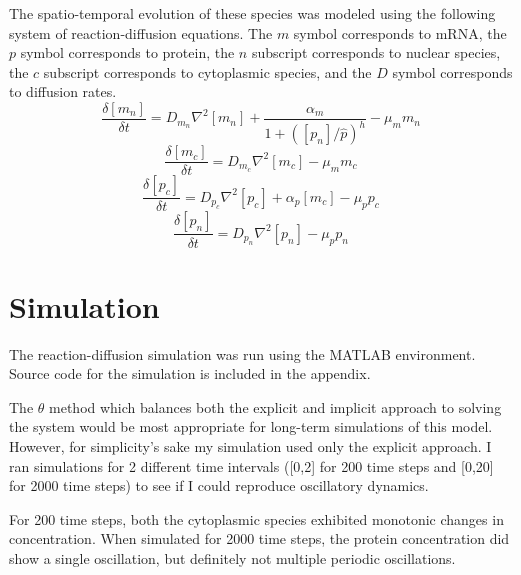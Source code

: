\documentclass{bioinfo}
\begin{document}
The spatio-temporal evolution of these species was modeled using the following system of reaction-diffusion equations.
The $m$ symbol corresponds to mRNA, the $p$ symbol corresponds to protein, the $n$ subscript corresponds to nuclear species, the $c$ subscript corresponds to cytoplasmic species, and the $D$ symbol corresponds to diffusion rates.
\[ \frac{\delta[m_n]}{\delta t} = D_{m_n} \nabla^2[m_n] + \frac{\alpha_m}{1+([p_n]/\hat{p})^h} - \mu_m{m_n} \]
\[ \frac{\delta[m_c]}{\delta t} = D_{m_c} \nabla^2[m_c] - \mu_m{m_c} \]
\[ \frac{\delta[p_c]}{\delta t} = D_{p_c} \nabla^2[p_c] + \alpha_p[m_c] - \mu_p{p_c} \]
\[ \frac{\delta[p_n]}{\delta t} = D_{p_n} \nabla^2[p_n] - \mu_p{p_n} \]

\section*{Simulation}
The reaction-diffusion simulation was run using the MATLAB environment.
Source code for the simulation is included in the appendix.

The $\theta$ method which balances both the explicit and implicit approach to solving the system would be most appropriate for long-term simulations of this model.
However, for simplicity's sake my simulation used only the explicit approach.
I ran simulations for 2 different time intervals ([0,2] for 200 time steps and [0,20] for 2000 time steps) to see if I could reproduce oscillatory dynamics.

For 200 time steps, both the cytoplasmic species exhibited monotonic changes in concentration.
When simulated for 2000 time steps, the protein concentration did show a single oscillation, but definitely not multiple periodic oscillations.
\end{document}
